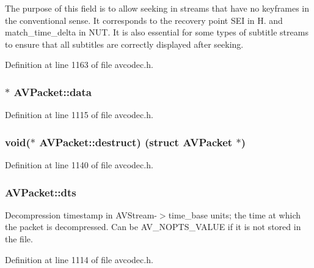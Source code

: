 The purpose of this field is to allow seeking in streams that have no keyframes in the conventional sense. It corresponds to the recovery point S\+EI in H. and match\+\_\+time\+\_\+delta in N\+UT. It is also essential for some types of subtitle streams to ensure that all subtitles are correctly displayed after seeking. 

Definition at line 1163 of file avcodec.\+h.

\subsubsection[{\texorpdfstring{data}{data}}]{$\ast$ A\+V\+Packet\+::data}\hypertarget{struct_a_v_packet_aaf4fe58dfcc7c232c1f2268b539d8367}{}\label{struct_a_v_packet_aaf4fe58dfcc7c232c1f2268b539d8367}


Definition at line 1115 of file avcodec.\+h.

\subsubsection[{\texorpdfstring{destruct}{destruct}}]{ {\bf void}($\ast$ A\+V\+Packet\+::destruct) (struct {\bf A\+V\+Packet} $\ast$)}\hypertarget{struct_a_v_packet_ad6441dd4a01abd03fdd05141e6bc4d6d}{}\label{struct_a_v_packet_ad6441dd4a01abd03fdd05141e6bc4d6d}


Definition at line 1140 of file avcodec.\+h.

\subsubsection[{\texorpdfstring{dts}{dts}}]{ A\+V\+Packet\+::dts}\hypertarget{struct_a_v_packet_a85dbbd306b44b02390cd91c45e6a0f76}{}\label{struct_a_v_packet_a85dbbd306b44b02390cd91c45e6a0f76}
Decompression timestamp in A\+V\+Stream-\/$>$time\+\_\+base units; the time at which the packet is decompressed. Can be A\+V\+\_\+\+N\+O\+P\+T\+S\+\_\+\+V\+A\+L\+UE if it is not stored in the file. 

Definition at line 1114 of file avcodec.\+h.

